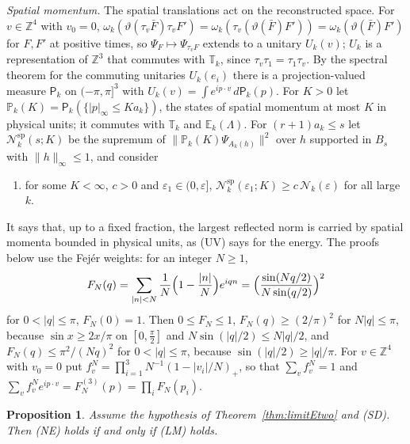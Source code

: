 \documentclass[aps,prd,twocolumn,superscriptaddress,nofootinbib,longbibliography,floatfix,amsmath,amssymb,10pt]{revtex4-2}
\newtheorem{proposition}[theorem]{Proposition}
\theoremstyle{definition}
\theoremstyle{remark}
\newcommand{\Z}{\mathbb{Z}}
\begin{document}
\emph{Spatial momentum.} The spatial translations act on the reconstructed
space. For $v\in\Z^4$ with $v_0=0$, $\omega_k(\vartheta(\tau_v\bar F)
\tau_vF')=\omega_k(\tau_v(\vartheta(\bar F)F'))=\omega_k(\vartheta(\bar F)F')$
for $F,F'$ at positive times, so $\Psi_F\mapsto\Psi_{\tau_vF}$ extends to a
unitary $U_k(v)$; $U_k$ is a representation of $\Z^3$ that commutes with
$\mathbb T_k$, since $\tau_v\tau_1=\tau_1\tau_v$. By the spectral theorem for
the commuting unitaries $U_k(e_i)$ there is a projection-valued measure
$\mathsf P_k$ on $(-\pi,\pi]^3$ with $U_k(v)=\int e^{ip\cdot v}\,d\mathsf
P_k(p)$. For $K>0$ let $\mathbb P_k(K)=\mathsf P_k(\{|p|_\infty\le Ka_k\})$,
the states of spatial momentum at most $K$ in physical units; it commutes
with $\mathbb T_k$ and $\mathbb E_k(\Lambda)$. For $(r+1)a_k\le s$ let
$\mathcal N^{\mathrm{sp}}_k(s;K)$ be the supremum of $\|\mathbb P_k(K)
\Psi_{A_k(h)}\|^2$ over $h$ supported in $B_s$ with $\|h\|_\infty\le1$, and
consider
\begin{enumerate}[label=\textup{(LM)},leftmargin=*]
\item for some $K<\infty$, $c>0$ and $\varepsilon_1\in(0,\varepsilon]$,
$\mathcal N^{\mathrm{sp}}_k(\varepsilon_1;K)\ge c\,\mathcal N_k(\varepsilon)$
for all large $k$.
\end{enumerate}
It says that, up to a fixed fraction, the largest reflected norm is carried
by spatial momenta bounded in physical units, as (UV) says for the energy.
The proofs below use the Fej\'er weights: for an integer $N\ge1$,
\[
F_N(q)=\sum_{|n|<N}\frac1N\Bigl(1-\frac{|n|}N\Bigr)e^{iqn}=\Bigl(\frac{\sin
(Nq/2)}{N\sin(q/2)}\Bigr)^2
\]
for $0<|q|\le\pi$, $F_N(0)=1$. Then $0\le F_N\le1$, $F_N(q)\ge(2/\pi)^2$ for
$N|q|\le\pi$, because $\sin x\ge2x/\pi$ on $[0,\frac\pi2]$ and $N\sin(|q|/2)
\le N|q|/2$, and $F_N(q)\le\pi^2/(Nq)^2$ for $0<|q|\le\pi$, because
$\sin(|q|/2)\ge|q|/\pi$. For $v\in\Z^4$ with $v_0=0$ put $f^N_v=\prod_{i=1}^3
N^{-1}(1-|v_i|/N)_+$, so that $\sum_vf^N_v=1$ and $\sum_vf^N_ve^{ip\cdot v}=
F_N^{(3)}(p)=\prod_iF_N(p_i)$.

\begin{proposition}\label{prop:limitElm}
Assume the hypothesis of Theorem~\textup{\ref{thm:limitEtwo}} and
\textup{(SD)}. Then \textup{(NE)} holds if and only if \textup{(LM)} holds.
\end{proposition}
\end{document}
